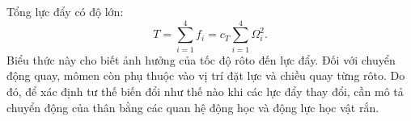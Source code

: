 Tổng lực đẩy có độ lớn:
\begin{equation}
	T=\sum_{i=1}^{4}f_i=c_T\sum_{i=1}^{4}\Omega_i^2.
	\label{eq:background-total-thrust}
\end{equation}
Biểu thức này cho biết ảnh hưởng của tốc độ rôto đến lực đẩy. Đối với chuyển động quay, mômen còn phụ thuộc vào vị trí đặt lực và chiều quay từng rôto. Do đó, để xác định tư thế biến đổi như thế nào khi các lực đẩy thay đổi, cần mô tả chuyển động của thân bằng các quan hệ động học và động lực học vật rắn.
